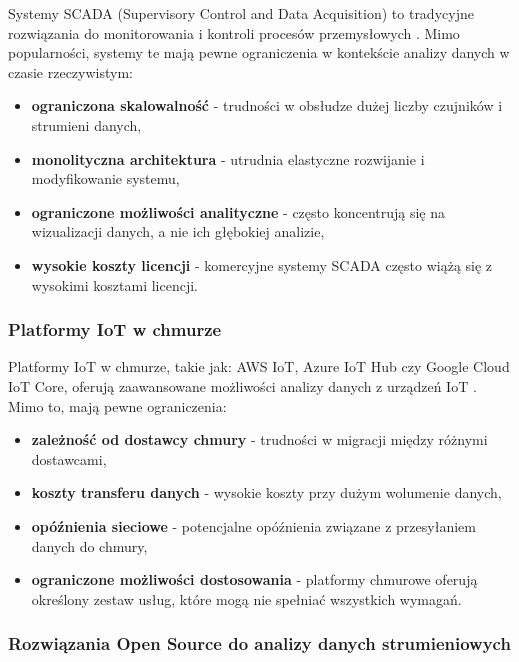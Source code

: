 Systemy SCADA (Supervisory Control and Data Acquisition) to tradycyjne rozwiązania do monitorowania i kontroli procesów przemysłowych \cite{scada}.
Mimo popularności, systemy te mają pewne ograniczenia w kontekście analizy danych w czasie rzeczywistym:

\begin{itemize}
    \item \textbf{ograniczona skalowalność} - trudności w obsłudze dużej liczby czujników i strumieni danych,
    \item \textbf{monolityczna architektura} - utrudnia elastyczne rozwijanie i modyfikowanie systemu,
    \item \textbf{ograniczone możliwości analityczne} - często koncentrują się na wizualizacji danych, a nie ich głębokiej analizie,
    \item \textbf{wysokie koszty licencji} - komercyjne systemy SCADA często wiążą się z wysokimi kosztami licencji.
\end{itemize}

\subsubsection{Platformy IoT w chmurze}
\label{subsubsec:cloud_iot}

Platformy IoT w chmurze, takie jak: AWS IoT, Azure IoT Hub czy Google Cloud IoT Core, oferują zaawansowane możliwości analizy danych z
urządzeń IoT \cite{cloud_iot}. Mimo to, mają pewne ograniczenia:

\begin{itemize}
    \item \textbf{zależność od dostawcy chmury} - trudności w migracji między różnymi dostawcami,
    \item \textbf{koszty transferu danych} - wysokie koszty przy dużym wolumenie danych,
    \item \textbf{opóźnienia sieciowe} - potencjalne opóźnienia związane z przesyłaniem danych do chmury,
    \item \textbf{ograniczone możliwości dostosowania} - platformy chmurowe oferują określony zestaw usług, które mogą nie spełniać wszystkich wymagań.
\end{itemize}

\subsubsection{Rozwiązania Open Source do analizy danych strumieniowych}
\label{subsubsec:open_source}

